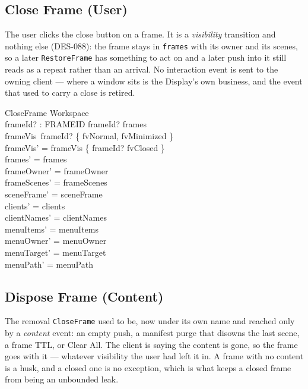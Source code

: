 \documentclass[a4paper,10pt,fleqn]{article}
\begin{document}
\subsection{Close Frame (User)}

The user clicks the close button on a frame.  It is a \emph{visibility}
transition and nothing else (DES-088): the frame stays in \texttt{frames}
with its owner and its scenes, so a later \texttt{RestoreFrame} has
something to act on and a later push into it still reads as a repeat
rather than an arrival.  No interaction event is sent to the owning
client --- where a window sits is the Display's own business, and the
event that used to carry a close is retired.

\begin{schema}{CloseFrame}
  \Delta Workspace \\
  frameId? : FRAMEID
  \where
  frameId? \in frames \\
  frameVis~frameId? \in \{ fvNormal, fvMinimized \} \\
  frameVis' = frameVis \oplus \{ frameId? \mapsto fvClosed \} \\
  frames' = frames \\
  frameOwner' = frameOwner \\
  frameScenes' = frameScenes \\
  sceneFrame' = sceneFrame \\
  clients' = clients \\
  clientNames' = clientNames \\
  menuItems' = menuItems \\
  menuOwner' = menuOwner \\
  menuTarget' = menuTarget \\
  menuPath' = menuPath
\end{schema}

\subsection{Dispose Frame (Content)}

The removal \texttt{CloseFrame} used to be, now under its own name and
reached only by a \emph{content} event: an empty push, a manifest purge
that disowns the last scene, a frame TTL, or Clear All.  The client is
saying the content is gone, so the frame goes with it --- whatever
visibility the user had left it in.  A frame with no content is a husk,
and a closed one is no exception, which is what keeps a closed frame from
being an unbounded leak.
\end{document}
